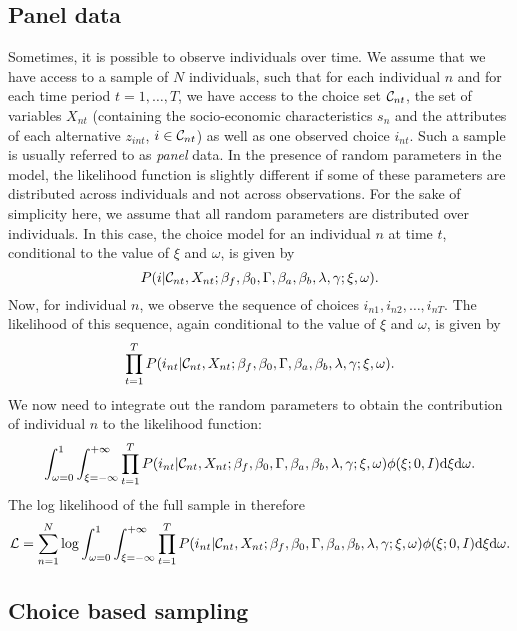 \documentclass[12pt]{memoir}
\begin{document}
\subsection{Panel data}

Sometimes, it is possible to observe individuals over time. We assume that we have access to a sample of $N$ individuals, such
that for each individual $n$ and for each time period $t=1,\ldots,T$, we have access to the choice set $\mathcal{C}_{nt}$,
the set of variables $X_{nt}$ (containing the socio-economic
characteristics $s_n$ and the attributes of each
alternative $z_{int}$, $i\in\mathcal{C}_{nt}$) as well as one observed choice
$i_{nt}$. Such a sample is usually referred to as \emph{panel} data.
In the presence of random parameters in the model, the likelihood
function is slightly different if some of these parameters are
distributed across individuals and not across observations. For the
sake of simplicity here, we assume that all random parameters are
distributed over individuals. In this case, the choice model for an
individual $n$ at time $t$, conditional to the value of $\xi$ and
$\omega$,  is given by 
      \[
      P(i|\mathcal{C}_{nt}, X_{nt};
      \beta_f,\beta_0,\Gamma,\beta_a,\beta_b,\lambda,\gamma;\xi,\omega).
\]
Now, for individual $n$, we observe the sequence of choices $i_{n1},
i_{n2},\ldots, i_{nT}$. The likelihood of this sequence, again
conditional to the value of $\xi$ and $\omega$, is given by
\begin{equation}
\prod_{t=1}^T
      P(i_{nt}|\mathcal{C}_{nt}, X_{nt};
      \beta_f,\beta_0,\Gamma,\beta_a,\beta_b,\lambda,\gamma;\xi,\omega).
\end{equation}
We now need to integrate out the random parameters to obtain the
contribution of individual $n$ to the likelihood function:
\begin{equation}
      \int_{\omega=0}^1 \int_{\xi=-\infty}^{+\infty}
\prod_{t=1}^T
      P(i_{nt}|\mathcal{C}_{nt}, X_{nt};
      \beta_f,\beta_0,\Gamma,\beta_a,\beta_b,\lambda,\gamma;\xi,\omega)\phi(\xi;0,I)  \text{d}\xi  \text{d}\omega.
\end{equation}
The log likelihood of the full sample in therefore
\begin{equation}
\mathcal{L} = \sum_{n=1}^N \log       \int_{\omega=0}^1 \int_{\xi=-\infty}^{+\infty}
\prod_{t=1}^T
      P(i_{nt}|\mathcal{C}_{nt}, X_{nt};
      \beta_f,\beta_0,\Gamma,\beta_a,\beta_b,\lambda,\gamma;\xi,\omega)\phi(\xi;0,I)  \text{d}\xi  \text{d}\omega.
\end{equation}

\subsection{Choice based sampling}
\label{sec:selectionBias}
\end{document}
